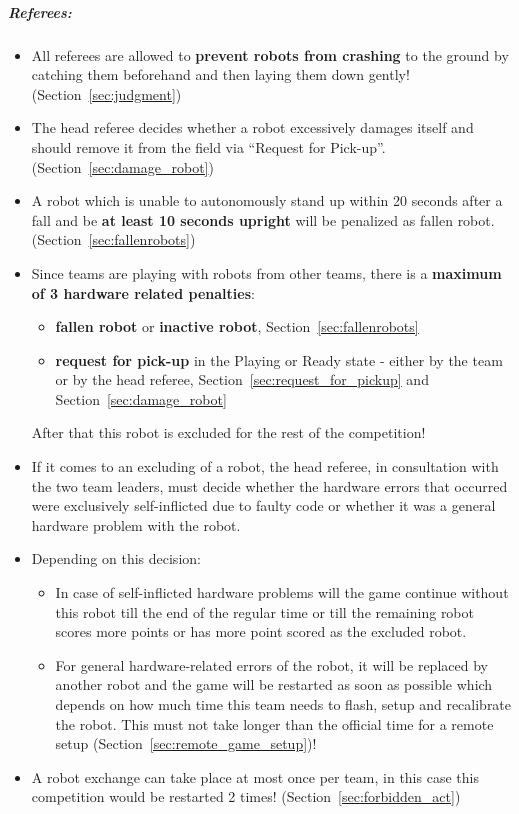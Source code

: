 \subparagraph{Referees:}
\begin{itemize}
	\item All referees are allowed to \textbf{prevent robots from crashing} to the ground by catching them beforehand and then laying them down gently! (\cf Section~\ref{sec:judgment}) 
	
	\item The head referee decides whether a robot excessively damages itself and should remove it from the field via ``Request for Pick-up''. (\cf Section~\ref{sec:damage_robot})
	
	\item A robot which is unable to autonomously stand up within 20 seconds after a fall and be \textbf{at least 10 seconds upright} will be penalized as fallen robot. (\cf Section~\ref{sec:fallenrobots})
	
	\item Since teams are playing with robots from other teams, there is a \textbf{maximum of 3 hardware related penalties}:
		\begin{itemize}
			\item \textbf{fallen robot} or \textbf{inactive robot}, \cf Section~\ref{sec:fallenrobots}
			\item \textbf{request for pick-up} in the Playing or Ready state - either by the team or by the head referee, \cf Section~\ref{sec:request_for_pickup} and Section~\ref{sec:damage_robot}
		\end{itemize}
		After that this robot is excluded for the rest of the competition!
	
	\item If it comes to an excluding of a robot, the head referee, in consultation with the two team leaders, must decide whether the hardware errors that occurred were exclusively self-inflicted due to faulty code or whether it was a general hardware problem with the robot.
	
	\item Depending on this decision:
	\begin{itemize}
		\item In case of self-inflicted hardware problems will the game continue without this robot till the end of the regular time or till the remaining robot scores more points or has more point scored as the excluded robot. 
		\item For general hardware-related errors of the robot, it will be replaced by another robot and the game will be restarted as soon as possible which depends on how much time this team needs to flash, setup and recalibrate the robot. This must not take longer than the official time for a remote setup (\cf Section~\ref{sec:remote_game_setup})!
	\end{itemize}
	\item A robot exchange can take place at most once per team, in this case this competition would be restarted 2 times! (\cf Section~\ref{sec:forbidden_act})
\end{itemize}

